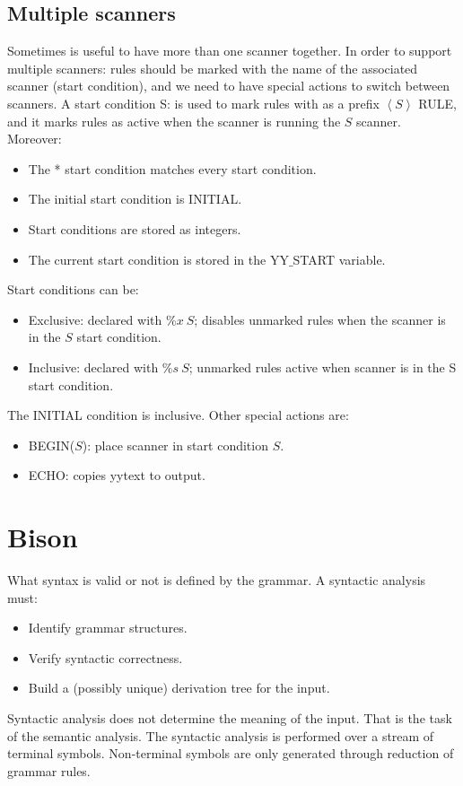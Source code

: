 \documentclass[12pt, a4paper]{report}
\begin{document}
    \subsection{Multiple scanners}
    Sometimes is useful to have more than one scanner together. In order to support multiple scanners: rules should be marked with the name of the associated scanner (start 
    condition), and we need to have special actions to switch between scanners. A start condition S: is used to mark rules with as a prefix 
    $\left\langle S \right\rangle$ RULE, and it marks rules as active when the scanner is running the $S$ scanner. Moreover:
    \begin{itemize}
        \item The * start condition matches every start condition. 
        \item The initial start condition is INITIAL. 
        \item Start conditions are stored as integers.
        \item The current start condition is stored in the YY$\_$START variable.
    \end{itemize}
    Start conditions can be: 
    \begin{itemize}
        \item Exclusive: declared with $\%x \: S$; disables unmarked rules when the scanner is in the $S$ start condition. 
        \item Inclusive: declared with $\%s \: S$; unmarked rules active when scanner is in the S start condition. 
    \end{itemize}
    The INITIAL condition is inclusive. Other special actions are: 
    \begin{itemize}
        \item BEGIN($S$): place scanner in start condition $S$. 
        \item ECHO: copies yytext to output.
    \end{itemize}

    \section{Bison}
        What syntax is valid or not is defined by the grammar. A syntactic analysis must:
        \begin{itemize}
            \item Identify grammar structures.
            \item Verify syntactic correctness.
            \item Build a (possibly unique) derivation tree for the input.
        \end{itemize}
        Syntactic analysis does not determine the meaning of the input. That is the task of the semantic analysis. The syntactic analysis is performed over a stream of
        terminal symbols. Non-terminal symbols are only generated through reduction of grammar rules. 
\end{document}

